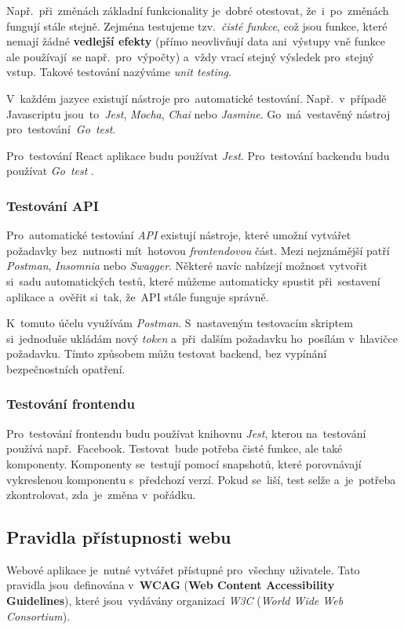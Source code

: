 \documentclass[10pt,a4paper]{article}
\begin{document}
            Např.~při~změnách základní funkcionality je~dobré otestovat, že~i~po~změnách fungují stále stejně. Zejména testujeme tzv.~\emph{čisté funkce}, což jsou funkce, které nemají žádné \textbf{vedlejší efekty} (přímo neovlivňují data ani~výstupy vně funkce ale používají~se např.~pro~výpočty) a~vždy vrací stejný výsledek pro~stejný vstup. Takové testování nazýváme \emph{unit testing}.
            
            V~každém jazyce existují nástroje pro~automatické testování. Např.~v~případě Javascriptu jsou~to~\emph{Jest}, \emph{Mocha}, \emph{Chai} nebo \emph{Jasmine}. Go~má~vestavěný nástroj pro~testování~\emph{Go~test}.
            
            Pro~testování React aplikace budu používat \emph{Jest}. Pro~testování backendu budu používat \emph{Go~test} \cite{jestjsTestingReact}.
            
            \subsubsection{Testování API}
                Pro~automatické testování \emph{API} existují nástroje, které umožní vytvářet požadavky bez~nutnosti mít~hotovou \emph{frontendovou} část. Mezi nejznámější patří \emph{Postman}, \emph{Insomnia} nebo \emph{Swagger}. Některé navíc nabízejí možnost vytvořit si~sadu automatických testů, které můžeme automaticky spustit při~sestavení aplikace a~ověřit si~tak, že~API stále funguje správně.

                K~tomuto účelu využívám \emph{Postman}. S~nastaveným testovacím skriptem si~jednoduše ukládám nový \emph{token} a~při~dalším požadavku ho~posílám v~hlavičce požadavku. Tímto způsobem můžu testovat backend, bez vypínání bezpečnostních opatření.

            \subsubsection{Testování frontendu}
                Pro~testování frontendu budu používat knihovnu \emph{Jest}, kterou na~testování používá např.~Facebook. Testovat~bude potřeba čisté funkce, ale také komponenty. Komponenty se~testují pomocí snapshotů, které porovnávají vykreslenou komponentu s~předchozí verzí. Pokud se~liší, test selže a~je~potřeba zkontrolovat, zda~je~změna v~pořádku. \cite{jestjsTestingReact}

        \subsection{Pravidla přístupnosti webu}
                Webové aplikace je~nutné vytvářet přístupné pro~všechny uživatele. Tato pravidla jsou~definována v~\textbf{WCAG} (\textbf{Web Content Accessibility Guidelines}), které jsou~vydávány organizací \emph{W3C} (\emph{World Wide Web Consortium}).
\end{document}
